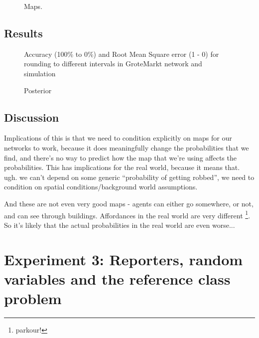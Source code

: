 \begin{figure}[htbp]
\begin{center}
\caption{Maps.}
\label{maps}
\end{center}
\end{figure}


\subsection{Results}

\begin{figure}[htbp]
\begin{center}

\caption{Accuracy (100\% to 0\%) and Root Mean Square error (1 - 0) for rounding to different intervals in GroteMarkt network and simulation}
\label{groteMarktMapsperfo}
\end{center}
\end{figure}

\begin{figure}[htbp]
\begin{center}
\caption{Posterior}
\label{groteMarktMapsp}
\end{center}
\end{figure}


\subsection{Discussion}
Implications of this is that we need to condition explicitly on maps for our networks to work, because it does meaningfully change the probabilities that we find, and there's no way to predict how the map that we're using affects the probabilities. This has implications for the real world, because it means that. ugh. we can't depend on some generic ``probability of getting robbed'', we need to condition on spatial conditions/background world assumptions.

And these are not even very good maps - agents can either go somewhere, or not, and can see through buildings. Affordances in the real world are very different \footnote{parkour!}. So it's likely that the actual probabilities in the real world are even worse...

\section{Experiment 3: Reporters, random variables and the reference class problem}

